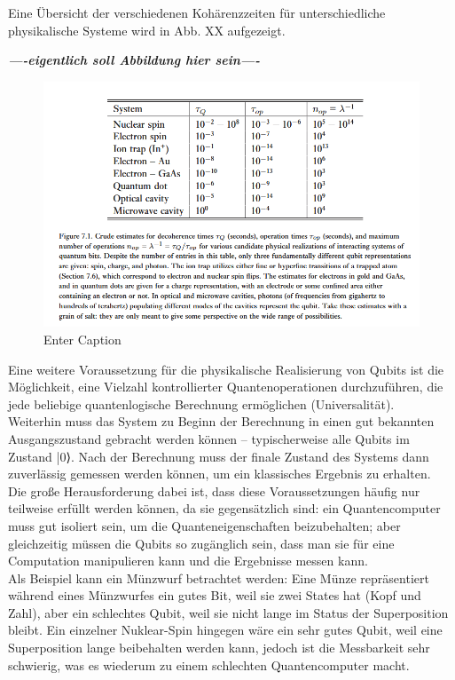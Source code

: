 Eine Übersicht der verschiedenen Kohärenzzeiten für unterschiedliche physikalische Systeme wird in Abb. XX aufgezeigt. 

\textbf{\textit{----eigentlich soll Abbildung hier sein----}}

\begin{figure}
    \centering
    \includegraphics[width=0.5\linewidth]{images/physics/uebersicht_physikalische_realisierung.png}
    \caption{Enter Caption}
    \label{fig:enter-label}
\end{figure}
 

 Eine weitere Voraussetzung für die physikalische Realisierung von Qubits ist die Möglichkeit, eine Vielzahl kontrollierter Quantenoperationen durchzuführen, die jede beliebige quantenlogische Berechnung ermöglichen (Universalität).\\
 
 Weiterhin  muss das System zu Beginn der Berechnung in einen gut bekannten Ausgangszustand gebracht werden können – typischerweise alle Qubits im Zustand |0⟩. Nach der Berechnung muss der finale Zustand des Systems dann zuverlässig gemessen werden können, um ein klassisches Ergebnis zu erhalten. \\

Die große Herausforderung dabei ist, dass diese Voraussetzungen häufig nur teilweise erfüllt werden können, da sie gegensätzlich sind: ein Quantencomputer muss gut isoliert sein, um die Quanteneigenschaften beizubehalten; aber gleichzeitig müssen die Qubits so zugänglich sein, dass man sie für eine Computation manipulieren kann und die Ergebnisse messen kann. \\
Als Beispiel kann ein Münzwurf betrachtet werden: Eine Münze repräsentiert während eines Münzwurfes ein gutes Bit, weil sie zwei States hat (Kopf und Zahl), aber ein schlechtes Qubit, weil sie nicht lange im Status der Superposition bleibt. Ein einzelner Nuklear-Spin hingegen wäre ein sehr gutes Qubit, weil eine Superposition lange beibehalten werden kann, jedoch ist die Messbarkeit sehr schwierig, was es wiederum zu einem schlechten Quantencomputer macht.  \\

